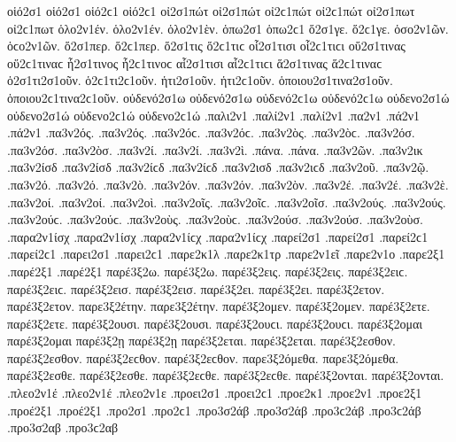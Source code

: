 {οἱό2σ1 οἱό2σ1 οἱό2ϲ1 οἱό2ϲ1   %
οἰ2σ1πώτ οἰ2σ1πώτ οἰ2ϲ1πώτ οἰ2ϲ1πώτ   %
οἰ2σ1πωτ οἰ2ϲ1πωτ 
ὁλο2ν1έν. ὁλο2ν1έν. 
ὁλο2ν1ὲν. 
ὁπω2σ1 ὁπω2ϲ1   %
ὅ2σ1γε. ὅ2ϲ1γε.   %
ὁσο2ν1ῶν. ὁϲο2ν1ῶν.   %
ὅ2σ1περ. ὅ2ϲ1περ.   %
ὅ2σ1τις ὅ2ϲ1τιϲ   %
οἷ2σ1τισι οἷ2ϲ1τιϲι   %
οὕ2σ1τινας οὕ2ϲ1τιναϲ   %
ἧ2σ1τινος ἧ2ϲ1τινοϲ   %
αἷ2σ1τισι αἷ2ϲ1τιϲι   %
ἅ2σ1τινας ἅ2ϲ1τιναϲ   %
ὁ2σ1τι2σ1οῦν. ὁ2ϲ1τι2ϲ1οῦν.   %
ἡτι2σ1οῦν. ἡτι2ϲ1οῦν.   %
ὁποιου2σ1τινα2σ1οῦν. ὁποιου2ϲ1τινα2ϲ1οῦν.   %
οὐδενό2σ1ω οὐδενό2σ1ω οὐδενό2ϲ1ω οὐδενό2ϲ1ω   %
οὐδενο2σ1ώ οὐδενο2σ1ώ οὐδενο2ϲ1ώ οὐδενο2ϲ1ώ 
.παλι2ν1   %
.παλί2ν1 .παλί2ν1   %
.πα2ν1 
.πά2ν1 .πά2ν1 
.πα3ν2ός. .πα3ν2ός. .πα3ν2όϲ. .πα3ν2όϲ.   %
.πα3ν2ὸς. .πα3ν2ὸϲ. 
.πα3ν2όσ. .πα3ν2όσ. 
.πα3ν2ὸσ. 
.πα3ν2ί. .πα3ν2ί. 
.πα3ν2ὶ. 
.πάνα. .πάνα. 
.πα3ν2ῶν. 
.πα3ν2ικ   %
.πα3ν2ίσδ .πα3ν2ίσδ .πα3ν2ίϲδ .πα3ν2ίϲδ   %
.πα3ν2ισδ .πα3ν2ιϲδ   %
.πα3ν2οῦ.   %
.πα3ν2ῷ. 
.πα3ν2ό. .πα3ν2ό. 
.πα3ν2ὸ. 
.πα3ν2όν. .πα3ν2όν. 
.πα3ν2ὸν. 
.πα3ν2έ. .πα3ν2έ. 
.πα3ν2ὲ. 
.πα3ν2οί. .πα3ν2οί. 
.πα3ν2οὶ. 
.πα3ν2οῖς. .πα3ν2οῖϲ. 
.πα3ν2οῖσ. 
.πα3ν2ούς. .πα3ν2ούς. .πα3ν2ούϲ. .πα3ν2ούϲ. 
.πα3ν2οὺς. .πα3ν2οὺϲ. 
.πα3ν2ούσ. .πα3ν2ούσ. 
.πα3ν2οὺσ. 
.παρα2ν1ίσχ .παρα2ν1ίσχ .παρα2ν1ίϲχ .παρα2ν1ίϲχ   %
.παρεί2σ1 .παρεί2σ1 .παρεί2ϲ1 .παρεί2ϲ1   %
.παρει2σ1 .παρει2ϲ1 
.παρε2κ1λ   %
.παρε2κ1τρ   %
.παρε2ν1εῖ   %
.παρε2ν1ο   %
.παρε2ξ1 
.παρέ2ξ1 .παρέ2ξ1 
παρέ3ξ2ω. παρέ3ξ2ω.   %
παρέ3ξ2εις. παρέ3ξ2εις. παρέ3ξ2ειϲ. παρέ3ξ2ειϲ. 
παρέ3ξ2εισ. παρέ3ξ2εισ. 
παρέ3ξ2ει. παρέ3ξ2ει. 
παρέ3ξ2ετον. παρέ3ξ2ετον. 
παρε3ξ2έτην. παρε3ξ2έτην. 
παρέ3ξ2ομεν. παρέ3ξ2ομεν. 
παρέ3ξ2ετε. παρέ3ξ2ετε. 
παρέ3ξ2ουσι. παρέ3ξ2ουσι. παρέ3ξ2ουϲι. παρέ3ξ2ουϲι. 
παρέ3ξ2ομαι παρέ3ξ2ομαι 
παρέ3ξ2ῃ παρέ3ξ2ῃ 
παρέ3ξ2εται. παρέ3ξ2εται. 
παρέ3ξ2εσθον. παρέ3ξ2εσθον. παρέ3ξ2εϲθον. παρέ3ξ2εϲθον. 
παρε3ξ2όμεθα. παρε3ξ2όμεθα. 
παρέ3ξ2εσθε. παρέ3ξ2εσθε. παρέ3ξ2εϲθε. παρέ3ξ2εϲθε. 
παρέ3ξ2ονται. παρέ3ξ2ονται. 
.πλεο2ν1έ .πλεο2ν1έ   %
.πλεο2ν1ε 
.προει2σ1 .προει2ϲ1   %
.προε2κ1   %
.προε2ν1   %
.προε2ξ1   %
.προέ2ξ1 .προέ2ξ1   %
.προ2σ1 .προ2ϲ1 
.προ3σ2άβ .προ3σ2άβ .προ3ϲ2άβ .προ3ϲ2άβ   %
.προ3σ2αβ .προ3ϲ2αβ 
}
